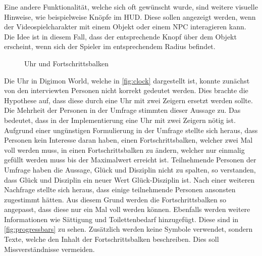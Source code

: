 Eine andere Funktionalität, welche sich oft gewünscht wurde, sind weitere visuelle Hinweise, wie beispielweise Knöpfe im \ac{HUD}.
Diese sollen angezeigt werden, wenn der Videospielcharakter mit einem Objekt oder einem \ac{NPC} interagieren kann.
Die Idee ist in diesem Fall, dass der entsprechende Knopf über dem Objekt erscheint, wenn sich der Spieler im entsprechendem Radius befindet.\\

\begin{figure}[H]%
    \centering
    \qquad
    \caption{Uhr und Fortschrittsbalken}%
    \label{fig:clock-progress}%
\end{figure}

Die Uhr in Digimon World, welche in \autoref{fig:clock} dargestellt ist, konnte zunächst von den interviewten Personen nicht korrekt gedeutet werden.
Dies brachte die Hypothese auf, dass diese durch eine Uhr mit zwei Zeigern ersetzt werden sollte.
Die Mehrheit der Personen in der Umfrage stimmten dieser Aussage zu.
Das bedeutet, dass in der Implementierung eine Uhr mit zwei Zeigern nötig ist. \\

Aufgrund einer ungünstigen Formulierung in der Umfrage stellte sich heraus, dass Personen kein Interesse daran haben, einen Fortschrittsbalken, welcher zwei Mal voll werden muss, in einen Fortschrittsbalken zu ändern, welcher nur einmalig gefüllt werden muss bis der Maximalwert erreicht ist.
Teilnehmende Personen der Umfrage haben die Aussage, Glück und Disziplin nicht zu spalten, so verstanden, dass Glück und Disziplin ein neuer Wert Glück-Disziplin ist.
Nach einer weiteren Nachfrage stellte sich heraus, dass einige teilnehmende Personen ansonsten zugestimmt hätten.
Aus diesem Grund werden die Fortschrittsbalken so angepasst, dass diese nur ein Mal voll werden können.
Ebenfalls werden weitere Informationen wie Sättigung und Toilettenbedarf hinzugefügt.
Diese sind in \autoref{fig:progressbars} zu sehen.
Zusätzlich werden keine Symbole verwendet, sondern Texte, welche den Inhalt der Fortschrittsbalken beschreiben.
Dies soll Missverständnisse vermeiden.\\


